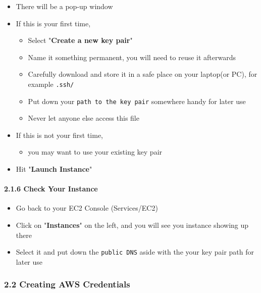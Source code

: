 \documentclass[]{article}
\let\oldparagraph\paragraph
\renewcommand{\paragraph}[1]{\oldparagraph{#1}\mbox{}}
\begin{document}
\begin{itemize}
\item
  There will be a pop-up window
\item
  If this is your first time,

  \begin{itemize}
  \item
    Select "\textbf{Create a new key pair}"
  \item
    Name it something permanent, you will need to reuse it afterwards
  \item
    Carefully download and store it in a safe place on your laptop(or
    PC), for example \texttt{.ssh/}
  \item
    Put down your \texttt{path\ to\ the\ key\ pair} somewhere handy for
    later use 
  \item
    Never let anyone else access this file
  \end{itemize}
\item
  If this is not your first time,

  \begin{itemize}
  \item
    you may want to use your existing key pair
  \end{itemize}
\item
  Hit "\textbf{Launch Instance}"
\end{itemize}

\hypertarget{header-n190}{%
\paragraph{2.1.6 Check Your Instance}\label{header-n190}}

\begin{itemize}
\item
  Go back to your EC2 Console (Services/EC2)
\item
  Click on "\textbf{Instances}" on the left, and you will see you
  instance showing up there
\item
  Select it and put down the \texttt{public\ DNS} aside with the your
  key pair path for later use
\end{itemize}

\hypertarget{header-n203}{%
\subsubsection{2.2 Creating AWS Credentials}\label{header-n203}}
\end{document}
